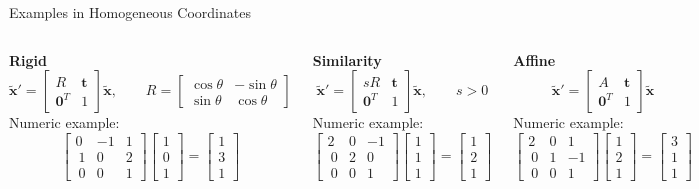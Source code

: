 \documentclass[aspectratio=169,10pt]{beamer}
\begin{document}
\begin{frame}{Examples in Homogeneous Coordinates}
\small
\begin{columns}[T,onlytextwidth]
\textbf{Rigid}
\[
\tilde{\mathbf{x}}' = \begin{bmatrix}R & \mathbf{t} \\\mathbf{0}^T & 1\end{bmatrix}\tilde{\mathbf{x}},\qquad
R=\begin{bmatrix}\cos\theta & -\sin\theta\\\sin\theta & \cos\theta\end{bmatrix}
\]
Numeric example:
\[
\begin{bmatrix}0 & -1 & 1 \\\ 1 & 0 & 2 \\\ 0 & 0 & 1\end{bmatrix}
\begin{bmatrix}1\\0\\1\end{bmatrix}=\begin{bmatrix}1\\3\\1\end{bmatrix}
\]

\textbf{Similarity}
\[
\tilde{\mathbf{x}}' = \begin{bmatrix}sR & \mathbf{t}\\\mathbf{0}^T & 1\end{bmatrix}\tilde{\mathbf{x}},\qquad s>0
\]
Numeric example:
\[
\begin{bmatrix}2 & 0 & -1 \\\ 0 & 2 & 0 \\\ 0 & 0 & 1\end{bmatrix}
\begin{bmatrix}1\\1\\1\end{bmatrix}=\begin{bmatrix}1\\2\\1\end{bmatrix}
\]

\textbf{Affine}
\[
\tilde{\mathbf{x}}' = \begin{bmatrix}A & \mathbf{t}\\\mathbf{0}^T & 1\end{bmatrix}\tilde{\mathbf{x}}
\]
Numeric example:
\[
\begin{bmatrix}2 & 0 & 1 \\\ 0 & 1 & -1 \\\ 0 & 0 & 1\end{bmatrix}
\begin{bmatrix}1\\2\\1\end{bmatrix}=\begin{bmatrix}3\\1\\1\end{bmatrix}
\]
\end{columns}
\end{frame}
\end{document}
